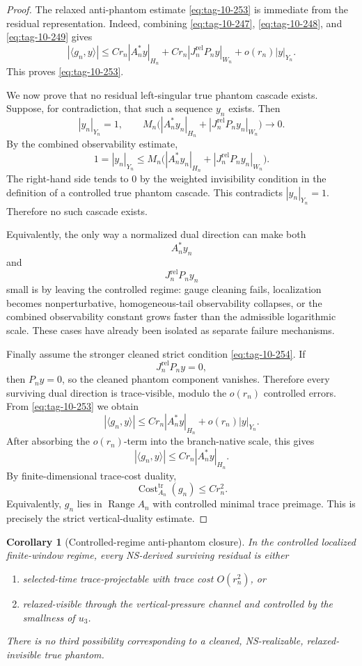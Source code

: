 \documentclass[11pt]{article}
\numberwithin{equation}{section}
\newtheorem{corollary}[theorem]{Corollary}
\begin{document}
\begin{proof}
The relaxed anti-phantom estimate \eqref{eq:tag-10-253} is immediate from the residual representation. Indeed, combining \eqref{eq:tag-10-247}, \eqref{eq:tag-10-248}, and \eqref{eq:tag-10-249} gives
\[
|\langle g_n,y\rangle|
\le
C r_n|A_n^*y|_{H_n}
+
C r_n|J_n^{\mathrm{rel}}P_n y|_{W_n}
+
o(r_n)|y|_{Y_n}.
\]
This proves \eqref{eq:tag-10-253}.

We now prove that no residual left-singular true phantom cascade exists. Suppose, for contradiction, that such a sequence \(y_n\) exists. Then
\[
|y_n|_{Y_n}=1,
\qquad
M_n\Big(|A_n^*y_n|_{H_n}+|J_n^{\mathrm{rel}}P_n y_n|_{W_n}\Big)\to0.
\]
By the combined observability estimate,
\begin{equation}
1 =
|y_n|_{Y_n}
\le
M_n\Big(
|A_n^*y_n|_{H_n}
+
|J_n^{\mathrm{rel}}P_n y_n|_{W_n}
\Big).
\label{eq:tag-10-257}
\end{equation}
The right-hand side tends to \(0\) by the weighted invisibility condition in the definition of a controlled true phantom cascade. This contradicts \(|y_n|_{Y_n}=1\). Therefore no such cascade exists.

Equivalently, the only way a normalized dual direction can make both
\[
A_n^*y_n
\]
and
\[
J_n^{\mathrm{rel}}P_ny_n
\]
small is by leaving the controlled regime: gauge cleaning fails, localization becomes nonperturbative, homogeneous-tail observability collapses, or the combined observability constant grows faster than the admissible logarithmic scale. These cases have already been isolated as separate failure mechanisms.

Finally assume the stronger cleaned strict condition \eqref{eq:tag-10-254}. If
\[
J_n^{\mathrm{rel}}P_ny=0,
\]
then \(P_ny=0\), so the cleaned phantom component vanishes. Therefore every surviving dual direction is trace-visible, modulo the \(o(r_n)\) controlled errors. From \eqref{eq:tag-10-253} we obtain
\[
|\langle g_n,y\rangle|
\le
C r_n|A_n^*y|_{H_n}
+
o(r_n)|y|_{Y_n}.
\]
After absorbing the \(o(r_n)\)-term into the branch-native scale, this gives
\[
|\langle g_n,y\rangle|
\le
C r_n|A_n^*y|_{H_n}.
\]
By finite-dimensional trace-cost duality,
\[
\operatorname{Cost}^{\operatorname{tr}}_{A_n}(g_n)
\le
C r_n^2.
\]
Equivalently, \(g_n\) lies in \(\operatorname{Range}A_n\) with controlled minimal trace preimage. This is precisely the strict vertical-duality estimate.
\end{proof}

\begin{corollary}[Controlled-regime anti-phantom closure]
In the controlled localized finite-window regime, every NS-derived surviving residual is either

\begin{enumerate}
\item selected-time trace-projectable with trace cost \(O(r_n^2)\), or
\item relaxed-visible through the vertical-pressure channel and controlled by the smallness of \(u_3\).
\end{enumerate}

There is no third possibility corresponding to a cleaned, NS-realizable, relaxed-invisible true phantom.
\end{corollary}
\end{document}
